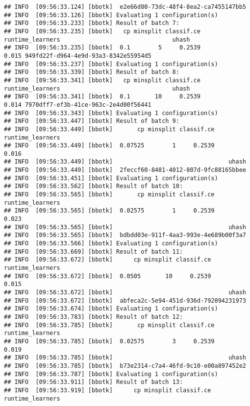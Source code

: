 \documentclass[
]{scrbook}
\begin{document}
\begin{verbatim}
## INFO  [09:56:33.124] [bbotk]  e2e66d80-73dc-48f4-8ea2-ca7455147bb5 
## INFO  [09:56:33.126] [bbotk] Evaluating 1 configuration(s) 
## INFO  [09:56:33.233] [bbotk] Result of batch 7: 
## INFO  [09:56:33.235] [bbotk]   cp minsplit classif.ce runtime_learners                                uhash 
## INFO  [09:56:33.235] [bbotk]  0.1        5     0.2539            0.015 949fd22f-d964-4e9d-93a3-8342e55954d5 
## INFO  [09:56:33.237] [bbotk] Evaluating 1 configuration(s) 
## INFO  [09:56:33.339] [bbotk] Result of batch 8: 
## INFO  [09:56:33.341] [bbotk]   cp minsplit classif.ce runtime_learners                                uhash 
## INFO  [09:56:33.341] [bbotk]  0.1       10     0.2539            0.014 7970dff7-ef3b-41ce-963c-2e4d00f56441 
## INFO  [09:56:33.343] [bbotk] Evaluating 1 configuration(s) 
## INFO  [09:56:33.447] [bbotk] Result of batch 9: 
## INFO  [09:56:33.449] [bbotk]       cp minsplit classif.ce runtime_learners 
## INFO  [09:56:33.449] [bbotk]  0.07525        1     0.2539            0.016 
## INFO  [09:56:33.449] [bbotk]                                 uhash 
## INFO  [09:56:33.449] [bbotk]  2feccf60-8481-4012-807d-9fc88165bbee 
## INFO  [09:56:33.451] [bbotk] Evaluating 1 configuration(s) 
## INFO  [09:56:33.562] [bbotk] Result of batch 10: 
## INFO  [09:56:33.565] [bbotk]       cp minsplit classif.ce runtime_learners 
## INFO  [09:56:33.565] [bbotk]  0.02575        1     0.2539            0.023 
## INFO  [09:56:33.565] [bbotk]                                 uhash 
## INFO  [09:56:33.565] [bbotk]  bdbdd03e-911f-4aa3-993e-4e689b00f3a7 
## INFO  [09:56:33.566] [bbotk] Evaluating 1 configuration(s) 
## INFO  [09:56:33.669] [bbotk] Result of batch 11: 
## INFO  [09:56:33.672] [bbotk]      cp minsplit classif.ce runtime_learners 
## INFO  [09:56:33.672] [bbotk]  0.0505       10     0.2539            0.015 
## INFO  [09:56:33.672] [bbotk]                                 uhash 
## INFO  [09:56:33.672] [bbotk]  abfeca2c-5e94-451d-936d-792094231973 
## INFO  [09:56:33.674] [bbotk] Evaluating 1 configuration(s) 
## INFO  [09:56:33.783] [bbotk] Result of batch 12: 
## INFO  [09:56:33.785] [bbotk]       cp minsplit classif.ce runtime_learners 
## INFO  [09:56:33.785] [bbotk]  0.02575        3     0.2539            0.019 
## INFO  [09:56:33.785] [bbotk]                                 uhash 
## INFO  [09:56:33.785] [bbotk]  b73e2314-c7a4-46fd-9c10-e00a897452e2 
## INFO  [09:56:33.787] [bbotk] Evaluating 1 configuration(s) 
## INFO  [09:56:33.911] [bbotk] Result of batch 13: 
## INFO  [09:56:33.919] [bbotk]      cp minsplit classif.ce runtime_learners 

\end{verbatim}
\end{document}
